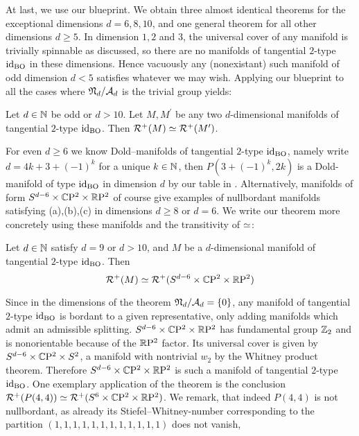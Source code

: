 At last, we use our {\color{themecolordark} blueprint}. 
We obtain three almost identical theorems for the exceptional dimensions $d=6,8,10$, and one general theorem for all other dimensions $d\geq 5$.
In dimension $1,2$ and $3$, the universal cover of any manifold is trivially spinnable as discussed, so there are no manifolds of tangential $2$-type $\operatorname{id}_{\mathrm{BO}}$ in these dimensions. 
Hence vacuously any (nonexistant) such manifold of odd dimension $d< 5$ satisfies whatever we may wish.
Applying our {\color{themecolordark} blueprint} to all the cases where $\mathfrak{N}_d/\mathcal{A}_d$ is the trivial group yields:
\begin{theorem}
    Let $d\in \mathbb{N}$ be odd or $d>10$. Let $M,M^\prime$ be any two $d$-dimensional manifolds of tangential $2$-type $\operatorname{id}_{\mathrm{BO}}$. Then $\mathcal{R}^+(M) \simeq \mathcal{R}^+(M^\prime)$.
\end{theorem}
For even $d\geq 6$ we know Dold--manifolds of tangential $2$-type $\operatorname{id}_{\mathrm{BO}}$, namely write $d= 4k + 3 + (-1)^k$ for a unique $k\in\mathbb{N}$, then $P(3 + (-1)^k,2k)$ is a Dold-manifold of type $\operatorname{id}_{\mathrm{BO}}$ in dimension $d$ by our table in . 
Alternatively, manifolds of form $S^{d-6}\times\mathbb{C}\mathrm{P}^2\times\mathbb{R}\mathrm{P}^2$ of course give examples of nullbordant manifolds satisfying (a),(b),(c) in dimensions $d\geq 8$ or $d=6$.
We write our theorem more concretely using these manifolds and the transitivity of $\simeq$:
\begin{theorem}
    Let $d\in\mathbb{N}$ satisfy $d=9$ or $d> 10$, and $M$ be a $d$-dimensional manifold of tangential $2$-type $\operatorname{id}_{\mathrm{BO}}$. Then
    \begin{equation*}
        \mathcal{R}^+(M) \simeq \mathcal{R}^+(S^{d-6}\times \mathbb{C}\mathrm{P}^2\times\mathbb{R}\mathrm{P}^2)
    \end{equation*}
\end{theorem}
\prf
Since in the dimensions of the theorem $\mathfrak{N}_d/\mathcal{A}_d = \{0\}$, any manifold of tangential $2$-type $\operatorname{id}_{\mathrm{BO}}$ is bordant to a given representative, only adding manifolds which admit an admissible splitting.
$S^{d-6}\times\mathbb{C}\mathrm{P}^2\times\mathbb{R}\mathrm{P}^2$ has fundamental group $\mathbb{Z}_2$ and is nonorientable because of the $\mathbb{R}\mathrm{P}^2$ factor. 
Its universal cover is given by $S^{d-6}\times\mathbb{C}\mathrm{P}^2\times S^2$, a manifold with nontrivial $w_2$ by the Whitney product theorem.
Therefore $S^{d-6}\times\mathbb{C}\mathrm{P}^2\times\mathbb{R}\mathrm{P}^2$ is such a manifold of tangential $2$-type $\operatorname{id}_{\mathrm{BO}}$.
\endprf
One exemplary application of the theorem is the conclusion $\mathcal{R}^+(P(4,4)) \simeq \mathcal{R}^+(S^6\times\mathbb{C}\mathrm{P}^2\times\mathbb{R}\mathrm{P}^2)$.
We remark, that indeed $P(4,4)$ is not nullbordant, as already its Stiefel--Whitney-number corresponding to the partition $(1,1,1,1,1,1,1,1,1,1,1,1)$ does not vanish,
